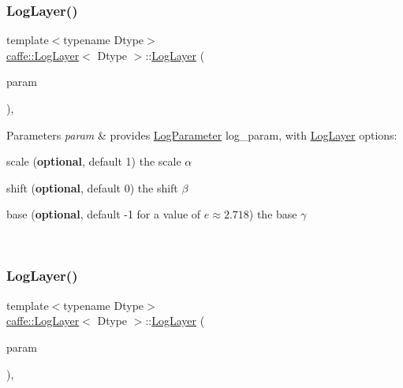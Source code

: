 \subsubsection{\texorpdfstring{Log\+Layer()}{LogLayer()}\hspace{0.1cm}{\footnotesize\ttfamily [1/2]}}
{\footnotesize\ttfamily template$<$typename Dtype$>$ \\
\mbox{\hyperlink{classcaffe_1_1_log_layer}{caffe\+::\+Log\+Layer}}$<$ Dtype $>$\+::\mbox{\hyperlink{classcaffe_1_1_log_layer}{Log\+Layer}} (\begin{DoxyParamCaption}\item[{const \mbox{\hyperlink{classcaffe_1_1_layer_parameter}{Layer\+Parameter}} \&}]{param }\end{DoxyParamCaption})\hspace{0.3cm}{\ttfamily [inline]}, {\ttfamily [explicit]}}


\begin{DoxyParams}{Parameters}
{\em param} & provides \mbox{\hyperlink{classcaffe_1_1_log_parameter}{Log\+Parameter}} log\+\_\+param, with \mbox{\hyperlink{classcaffe_1_1_log_layer}{Log\+Layer}} options\+:
\begin{DoxyItemize}
\item scale ({\bfseries optional}, default 1) the scale $ \alpha $
\item shift ({\bfseries optional}, default 0) the shift $ \beta $
\item base ({\bfseries optional}, default -\/1 for a value of $ e \approx 2.718 $) the base $ \gamma $ 
\end{DoxyItemize}\\
\hline
\end{DoxyParams}
\mbox{\label{classcaffe_1_1_log_layer_aa6f92a0b12140d70a44a2bcb71bab552}} 
\subsubsection{\texorpdfstring{Log\+Layer()}{LogLayer()}\hspace{0.1cm}{\footnotesize\ttfamily [2/2]}}
{\footnotesize\ttfamily template$<$typename Dtype$>$ \\
\mbox{\hyperlink{classcaffe_1_1_log_layer}{caffe\+::\+Log\+Layer}}$<$ Dtype $>$\+::\mbox{\hyperlink{classcaffe_1_1_log_layer}{Log\+Layer}} (\begin{DoxyParamCaption}\item[{const \mbox{\hyperlink{classcaffe_1_1_layer_parameter}{Layer\+Parameter}} \&}]{param }\end{DoxyParamCaption})\hspace{0.3cm}{\ttfamily [inline]}, {\ttfamily [explicit]}}


